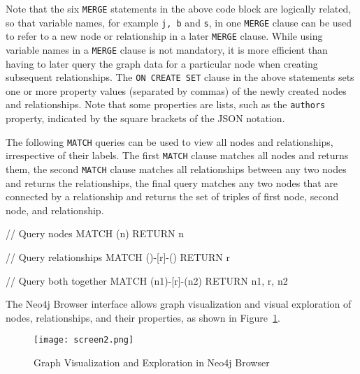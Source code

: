 Note that the six \texttt{MERGE} statements in the above code block are logically related, so that variable names, for example \texttt{j, b} and \texttt{s}, in one \texttt{MERGE} clause can be used to refer to a new node or relationship in a later \texttt{MERGE} clause. While using variable names in a \texttt{MERGE} clause is not mandatory, it is more efficient than having to later query the graph data for a particular node when creating subsequent relationships. The \texttt{ON CREATE SET} clause in the above statements sets one or more property values (separated by commas) of the newly created nodes and relationships. Note that some properties are lists, such as the \texttt{authors} property, indicated by the square brackets of the JSON notation. 

The following \texttt{MATCH} queries can be used to view all nodes and relationships, irrespective of their labels. The first \texttt{MATCH} clause matches all nodes and returns them, the second \texttt{MATCH} clause matches all relationships between any two nodes and returns the relationships, the final query matches any two nodes that are connected by a relationship and returns the set of triples of first node, second node, and relationship.

\begin{cyphercode}
// Query nodes
MATCH (n) RETURN n    
                
// Query relationships
MATCH ()-[r]-() RETURN r              

// Query both together
MATCH (n1)-[r]-(n2) RETURN n1, r, n2  
\end{cyphercode}

\noindent The Neo4j Browser interface allows graph visualization and visual exploration of nodes, relationships, and their properties, as shown in Figure~\ref{fig:neo4jgraphviz}.

\begin{figure}[h]
\centering
\texttt{[image: screen2.png]}
\caption{Graph Visualization and Exploration in Neo4j Browser}
\label{fig:neo4jgraphviz}
\end{figure}


